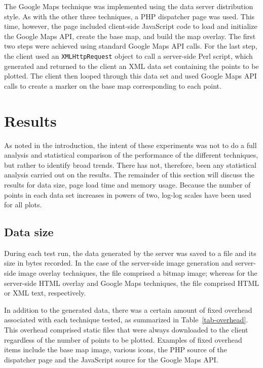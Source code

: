 \documentclass[acmnow]{acmtrans2m}
\begin{document}
The Google Maps technique was implemented using the data server
distribution style. As with the other three techniques, a PHP dispatcher
page was used. This time, however, the page included client-side
JavaScript code to load and initialize the Google Maps API, create the
base map, and build the map overlay. The first two steps were achieved
using standard Google Maps API calls. For the last step, the client used
an \texttt{XMLHttpRequest} object to call a server-side Perl script,
which generated and returned to the client an XML data set containing
the points to be plotted. The client then looped through this data set
and used Google Maps API calls to create a marker on the base map
corresponding to each point.


\section{Results}
\label{sec-results}

As noted in the introduction, the intent of these experiments was not to
do a full analysis and statistical comparison of the performance of the
different techniques, but rather to identify broad trends. There has
not, therefore, been any statistical analysis carried out on the
results. The remainder of this section will discuss the results for data
size, page load time and memory usage. Because the number of points in
each data set increases in powers of two, log-log scales have been used
for all plots.


\subsection{Data size}

During each test run, the data generated by the server was saved to a
file and its size in bytes recorded. In the case of the server-side
image generation and server-side image overlay techniques, the file
comprised a bitmap image; whereas for the server-side HTML overlay and
Google Maps techniques, the file comprised HTML or XML text,
respectively.

In addition to the generated data, there was a certain amount of fixed
overhead associated with each technique tested, as summarized in
Table~\ref{tab-overhead}. This overhead comprised static files that were
always downloaded to the client regardless of the number of points to be
plotted. Examples of fixed overhead items include the base map image,
various icons, the PHP source of the dispatcher page and the JavaScript
source for the Google Maps API.
\end{document}
